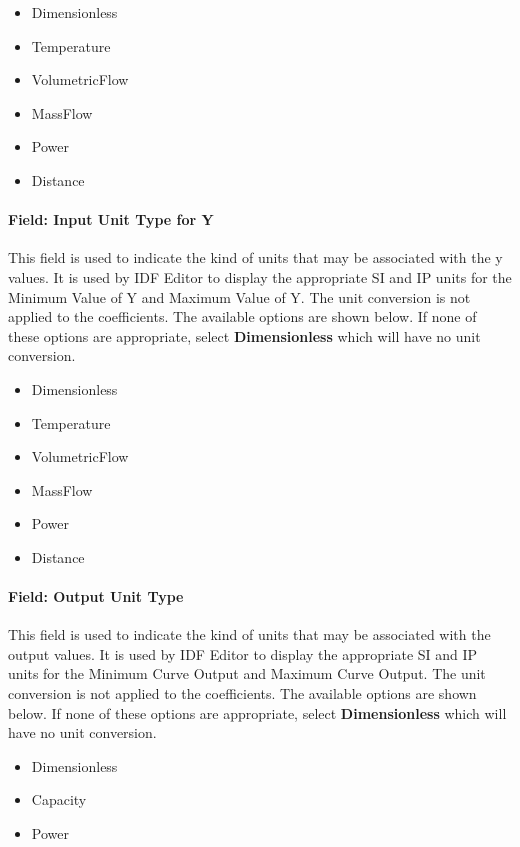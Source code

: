 \begin{itemize}
\item
  Dimensionless
\item
  Temperature
\item
  VolumetricFlow
\item
  MassFlow
\item
  Power
\item
  Distance
\end{itemize}

\paragraph{Field: Input Unit Type for Y}\label{field-input-unit-type-for-y-1}

This field is used to indicate the kind of units that may be associated with the y values. It is used by IDF Editor to display the appropriate SI and IP units for the Minimum Value of Y and Maximum Value of Y. The unit conversion is not applied to the coefficients. The available options are shown below. If none of these options are appropriate, select \textbf{Dimensionless} which will have no unit conversion.

\begin{itemize}
\item
  Dimensionless
\item
  Temperature
\item
  VolumetricFlow
\item
  MassFlow
\item
  Power
\item
  Distance
\end{itemize}

\paragraph{Field: Output Unit Type}\label{field-output-unit-type-5}

This field is used to indicate the kind of units that may be associated with the output values. It is used by IDF Editor to display the appropriate SI and IP units for the Minimum Curve Output and Maximum Curve Output. The unit conversion is not applied to the coefficients. The available options are shown below. If none of these options are appropriate, select \textbf{Dimensionless} which will have no unit conversion.

\begin{itemize}
\item
  Dimensionless
\item
  Capacity
\item
  Power
\end{itemize}

